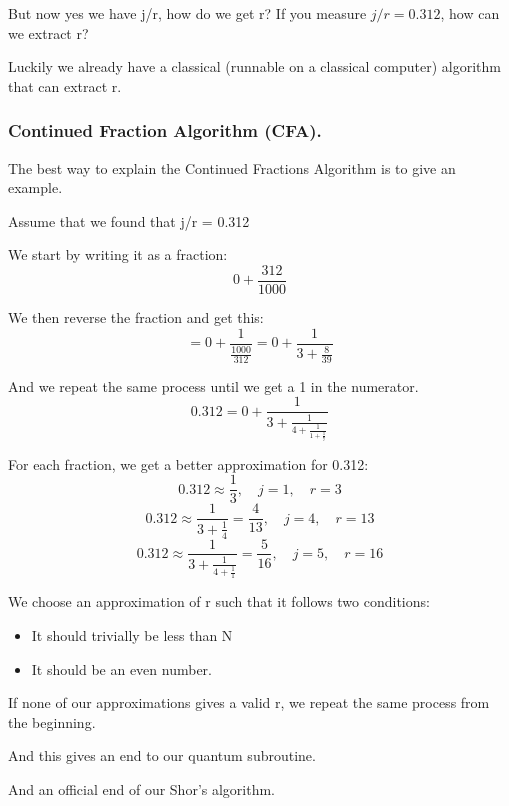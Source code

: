 But now yes we have j/r, how do we get r? If you measure $j/r = 0.312$, how can we extract r?

Luckily we already have a classical (runnable on a classical computer) algorithm that can extract r.
\subsubsection{Continued Fraction Algorithm (CFA).}

The best way to explain the Continued Fractions Algorithm is to give an example.

Assume that we found that j/r = 0.312

We start by writing it as a fraction:
$$
0 + \frac{312}{1000}
$$

We then reverse the fraction and get this:
$$
= 0 + \frac{1}{\frac{1000}{312}} = 0 + \frac{1}{3 + \frac{8}{39}}
$$

And we repeat the same process until we get a 1 in the numerator.
$$
0.312 = 0 + \frac{1}{3 + \frac{1}{4 + \frac{1}{1 + \frac{1}{7}}}}
$$

For each fraction, we get a better approximation for 0.312:
$$
0.312 \approx \frac{1}{3}, \quad j = 1, \quad r = 3
$$
$$
0.312 \approx \frac{1}{3 + \frac{1}{4}} = \frac{4}{13}, \quad j = 4, \quad r = 13
$$
$$
0.312 \approx \frac{1}{3 + \frac{1}{4 + \frac{1}{1}}} = \frac{5}{16}, \quad j = 5, \quad r = 16
$$

We choose an approximation of r such that it follows two conditions:
\begin{tcolorbox}
    \begin{itemize}
  \item[1-] It should trivially be less than N
  \item[2-] It should be an even number.
\end{itemize}
\end{tcolorbox}
If none of our approximations gives a valid r, we repeat the same process from the beginning.

And this gives an end to our quantum subroutine.

And an official end of our Shor’s algorithm.


